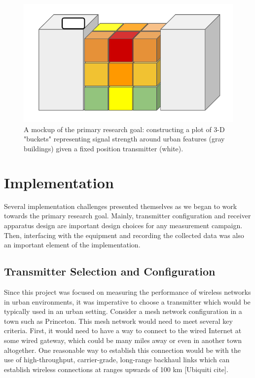 \documentclass[pageno]{jpaper}
\begin{document}
\begin{figure}[h]
	\caption{A mockup of the primary research goal: constructing a plot of 3-D "buckets" representing signal strength around urban features (gray buildings) given a fixed position transmitter (white).}
	\includegraphics{measurement_goal}
	\centering
\end{figure}

\section{Implementation}
Several implementation challenges presented themselves as we began to work towards the primary research goal. Mainly, transmitter configuration and receiver apparatus design are  important design choices for any measurement campaign. Then, interfacing with the equipment and recording the collected data was also an important element of the implementation.

\subsection{Transmitter Selection and Configuration}
Since this project was focused on measuring the performance of wireless networks in urban environments, it was imperative to choose a transmitter which would be typically used in an urban setting. Consider a mesh network configuration in a town such as Princeton. This mesh network would need to meet several key criteria. First, it would need to have a way to connect to the wired Internet at some wired gateway, which could be many miles away or even in another town altogether. One reasonable way to establish this connection would be with the use of high-throughput, carrier-grade, long-range backhaul links which can establish wireless connections at ranges upwards of 100 km [Ubiquiti cite].
\end{document}
